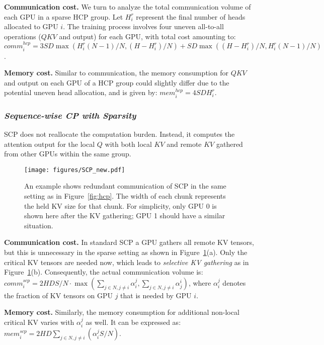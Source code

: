 \noindent\textbf{Communication cost.} 
We turn to analyze the total communication volume of each GPU in a sparse HCP group. 
Let $H_i^{r}$ represent the final number of heads allocated to GPU ${i}$. The training process involves four uneven all-to-all operations ($QKV$ and output) for each GPU, with total cost amounting to:
$comm_i^{hcp}=3SD\max(H_i^{r}(N-1)/N , (H-H_i^{r})/N ) + SD\max((H-H_i^{r})/N, H_i^{r}(N-1)/N )$.


\noindent\textbf{Memory cost.} 
Similar to communication, the memory consumption for $QKV$ and output on each GPU of a HCP group could slightly differ due to the potential uneven head allocation, and is given by: {$mem_{i}^{hcp}=4 S D H_i^{r}$}.


\subsubsection{\bf \em Sequence-wise CP with Sparsity} 
SCP does not reallocate the computation burden. Instead, it computes the attention output for the local $Q$ with both local $KV$ and remote $KV$ gathered from other GPUs within the same group.

\begin{figure}[t]
  \centering
  \texttt{[image: figures/SCP\_new.pdf]} 
    \caption{An example shows redundant communication of SCP in the same setting as in Figure~\ref{fig:hcp}. The width of each chunk represents the held KV size for that chunk. For simplicity, only GPU 0 is shown here after the KV gathering; GPU 1 should have a similar situation.}
  \label{fig:scp} 
\end{figure}


\noindent\textbf{Communication cost.} 
In standard SCP a GPU gathers all remote KV tensors, but this is unnecessary in the sparse setting as shown in Figure~\ref{fig:scp}(a). Only the critical KV tensors are needed now, which leads to \textit{selective KV gathering} as in Figure~\ref{fig:scp}(b). 
Consequently, the actual communication volume is:
{$comm_i^{scp}=2HDS/N\cdot \max(\sum_{j\in N,j\neq i}\alpha_{i}^{j}, \sum_{j\in N,j\neq i}\alpha_{j}^{i})$}, 
where $\alpha_{i}^{j}$ denotes the fraction of KV tensors on GPU $j$ that is needed by GPU $i$.

\noindent\textbf{Memory cost.} 
Similarly, the memory consumption for additional non-local critical KV varies with $\alpha_{i}^{j}$ as well. It can be expressed as:
{ $mem_i^{scp}=2HD\sum_{j\in N,j\neq i}(\alpha_{i}^{j}S/N).$}



